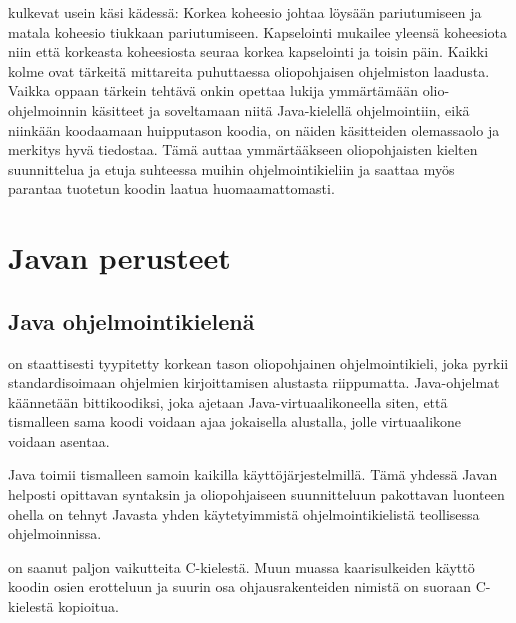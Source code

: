 \documentclass[a4paper,justified,notoc]{tufte-book}
\begin{document}
\begin{fullwidth}
 kulkevat usein käsi kädessä: Korkea koheesio johtaa löysään
pariutumiseen ja matala koheesio tiukkaan pariutumiseen. Kapselointi mukailee yleensä koheesiota
niin että korkeasta koheesiosta seuraa korkea kapselointi ja toisin päin. Kaikki kolme ovat
tärkeitä mittareita puhuttaessa oliopohjaisen ohjelmiston laadusta. Vaikka oppaan tärkein tehtävä
onkin opettaa lukija ymmärtämään olio-ohjelmoinnin käsitteet ja soveltamaan niitä
Java-kielellä ohjelmointiin, eikä niinkään koodaamaan huipputason koodia, on näiden käsitteiden
olemassaolo ja merkitys hyvä tiedostaa. Tämä auttaa ymmärtääkseen oliopohjaisten kielten
suunnittelua ja etuja suhteessa muihin ohjelmointikieliin ja saattaa myös parantaa tuotetun koodin
laatua huomaamattomasti.


\chapter{Javan perusteet}
\label{perusteet}	

\section{Java ohjelmointikielenä}
\label{javasta}

 on staattisesti tyypitetty korkean tason oliopohjainen ohjelmointikieli, joka
pyrkii standardisoimaan ohjelmien kirjoittamisen alustasta riippumatta. Java-ohjelmat käännetään
bittikoodiksi, joka ajetaan Java-virtuaalikoneella siten, että tismalleen sama koodi voidaan ajaa
jokaisella alustalla, jolle virtuaalikone voidaan asentaa.

 Java toimii tismalleen samoin kaikilla käyttöjärjestelmillä. Tämä
yhdessä Javan helposti opittavan syntaksin ja oliopohjaiseen suunnitteluun pakottavan luonteen
ohella on tehnyt Javasta yhden käytetyimmistä ohjelmointikielistä teollisessa ohjelmoinnissa.

 on saanut paljon vaikutteita C-kielestä. Muun muassa kaarisulkeiden
käyttö koodin osien erotteluun ja suurin osa ohjausrakenteiden nimistä on suoraan C-kielestä
kopioitua.


\end{fullwidth}
\end{document}
